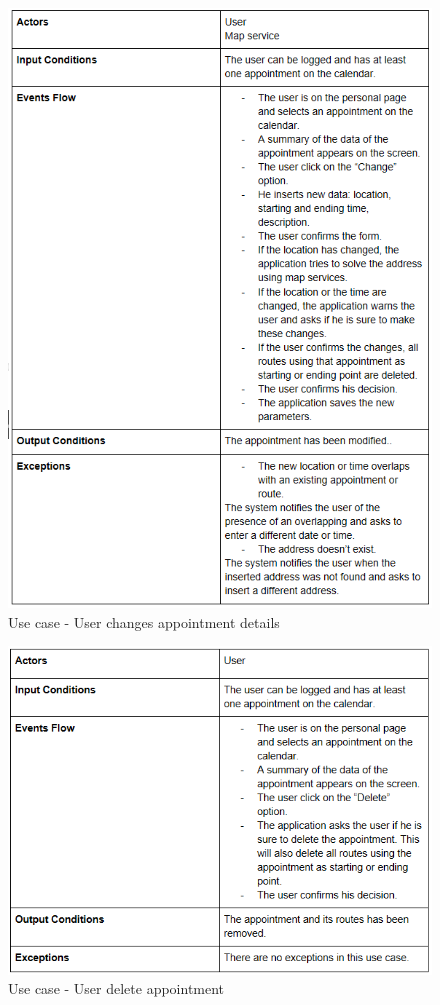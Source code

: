 \begin{figure}
	\centering
	\includegraphics{Images/UseCaseTables/5_usr_changes_app.png}
	\caption{\label{fig:useCase5}Use case - User changes appointment details }
\end{figure}

\begin{figure}
	\centering
	\includegraphics{Images/UseCaseTables/6_usr_del_app.PNG}
	\caption{\label{fig:useCase6}Use case - User delete appointment }
\end{figure}

